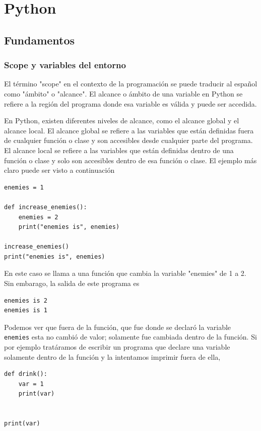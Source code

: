 \chapter{Python}


\section{Fundamentos}

\subsection{Scope y variables del entorno}

El término "scope" en el contexto de la programación se puede traducir al español como "ámbito" o "alcance". El alcance o ámbito de una variable en Python se refiere a la región del programa donde esa variable es válida y puede ser accedida.

En Python, existen diferentes niveles de alcance, como el alcance global y el alcance local. El alcance global se refiere a las variables que están definidas fuera de cualquier función o clase y son accesibles desde cualquier parte del programa. El alcance local se refiere a las variables que están definidas dentro de una función o clase y solo son accesibles dentro de esa función o clase. El ejemplo más claro puede ser visto a continuación

\begin{verbatim}
enemies = 1

def increase_enemies():
    enemies = 2
    print("enemies is", enemies)

increase_enemies()
print("enemies is", enemies)
\end{verbatim}

En este caso se llama a una función que cambia la variable "enemies" de 1 a 2. Sin embarago, la salida de este programa es

\begin{verbatim}
enemies is 2
enemies is 1
\end{verbatim}

Podemos ver que fuera de la función, que fue donde se declaró la variable \texttt{enemies} esta no cambió de valor; solamente fue cambiada dentro de la función. Si por ejemplo tratáramos de escribir un programa que declare una variable solamente dentro de la función y la intentamos imprimir fuera de ella,

\begin{verbatim}
def drink():
    var = 1
    print(var)


print(var)
\end{verbatim}

